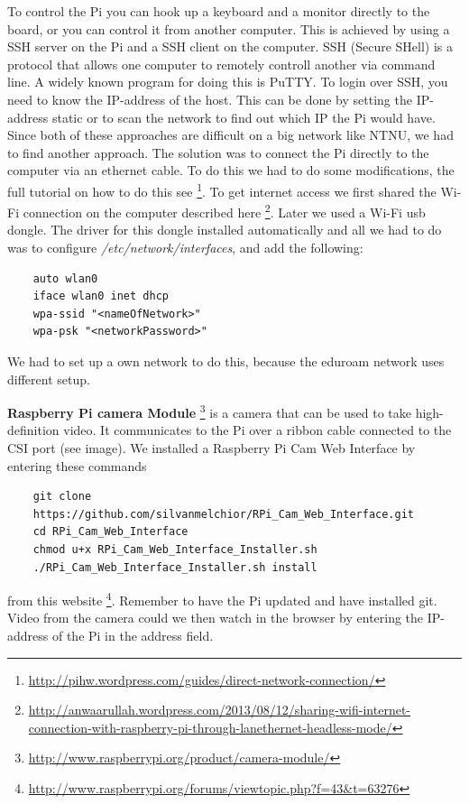 To control the Pi you can hook up a keyboard and a monitor directly to the board, or you can control it from another computer. 
This is achieved by using a SSH server on the Pi and a SSH client on the computer. 
SSH (Secure SHell) is a protocol that allows one computer to remotely controll another via command line. A widely known program for doing this is PuTTY. To login over SSH, you need to know the IP-address of the host. This can be done by setting the IP-address static or to scan the network to find out which IP the Pi would have. Since both of these approaches are difficult on a big network like NTNU, we had to find another approach. The solution was to connect the Pi directly to the computer via an ethernet cable. To do this we had to do some modifications, the full tutorial on how to do this see \footnote{\url{http://pihw.wordpress.com/guides/direct-network-connection/}}. To get internet access we first shared the Wi-Fi connection on the computer described here \footnote{\url{http://anwaarullah.wordpress.com/2013/08/12/sharing-wifi-internet-connection-with-raspberry-pi-through-lanethernet-headless-mode/}}. Later we used a Wi-Fi usb dongle. The driver for this dongle installed automatically and all we had to do was to configure \textit{/etc/network/interfaces}, and add the following:
\begin{verbatim}
    auto wlan0
    iface wlan0 inet dhcp
    wpa-ssid "<nameOfNetwork>"
    wpa-psk "<networkPassword>"
\end{verbatim}
We had to set up a own network to do this, because the eduroam network uses different setup.
\bigskip

\textbf{Raspberry Pi camera Module} \footnote{\url{http://www.raspberrypi.org/product/camera-module/}}
is a camera that can be used to take high-definition video. It communicates to the Pi over a ribbon cable connected to the CSI port (see image). We installed a Raspberry Pi Cam Web Interface by entering these commands
\begin{verbatim}
    git clone
    https://github.com/silvanmelchior/RPi_Cam_Web_Interface.git
    cd RPi_Cam_Web_Interface
    chmod u+x RPi_Cam_Web_Interface_Installer.sh
    ./RPi_Cam_Web_Interface_Installer.sh install
\end{verbatim}
from this website \footnote{\url{http://www.raspberrypi.org/forums/viewtopic.php?f=43&t=63276}}.
Remember to have the Pi updated and have installed git.
Video from the camera could we then watch in the browser by entering the IP-address of the Pi in the address field.
\bigskip

